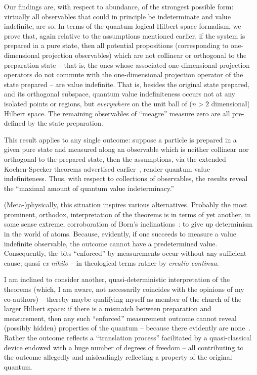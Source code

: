 \documentclass[%
 superscriptaddress,
 preprint,
 showpacs,
 showkeys,
 nofootinbib,
  amsmath,amssymb,
  aps,
  longbibliography,
  floatfix,
 ]{revtex4-1}
\theoremstyle{definition}
\begin{document}
Our findings are, with respect to abundance, of the strongest possible form: virtually all observables that could in principle be indeterminate and value indefinite, are so.
In terms of the quantum logical Hilbert space formalism, we prove that, again relative to the assumptions mentioned earlier,
if the system is prepared in a pure state, then all potential propositions (corresponding to one-dimensional projection observables)
which are not collinear or orthogonal to the preparation state
-- that is, the ones whose associated one-dimensional projection operators do not commute with the one-dimensional projection
operator of the state prepared  -- are value indefinite.
That is, besides the original state prepared, and its orthogonal subspace,
quantum value indefiniteness occurs not at any isolated points or regions, but {\em everywhere} on the unit ball of ($n>2$ dimensional) Hilbert space.
The remaining observables  of ``meagre'' measure zero are all pre-defined by the state preparation.

This result applies to any single outcome: suppose a particle is prepared in a given pure state and measured
along an observable which is neither collinear nor orthogonal to the prepared state,
then the assumptions, via the extended Kochen-Specker theorems advertised earlier~\cite{2012-incomput-proofsCJ,PhysRevA.89.032109,2015-AnalyticKS},
render quantum value indefiniteness.
Thus, with respect to collections of observables, the results reveal the ``maximal amount of quantum value indeterminacy.''


(Meta-)physically, this situation inspires various alternatives.
Probably the most prominent, orthodox, interpretation of the theorems is in terms of yet another, in some sense extreme,
corroboration of Born's inclinations~\cite[p.~866]{born-26-1}: to give up determinism in the world of atoms.
Because, evidently, if one succeeds to measure a value indefinite observable, the outcome cannot have a predetermined value.
Consequently, the bits ``enforced'' by measurements occur without any sufficient cause; quasi {\it ex nihilo} --
in theological terms rather by {\it creatio continua}.

I am inclined to consider another, quasi-deterministic interpretation of the theorems (which, I am aware, not necessarily coincides with the opinions of my co-authors)
-- thereby maybe qualifying myself as member of the church of the larger Hilbert space:
if there is a mismatch between preparation and measurement, then any such ``enforced'' measurement outcome cannot reveal (possibly hidden)
properties of the quantum -- because there evidently are none~\cite{zeil-05_nature_ofQuantum,zeil-bruk-99a,zeil-bruk-02}.
Rather the outcome reflects a ``translation process'' facilitated by a quasi-classical device
endowed with a huge number of degrees of freedom -- all contributing to the outcome allegedly and misleadingly reflecting a property of the original quantum.
\end{document}

